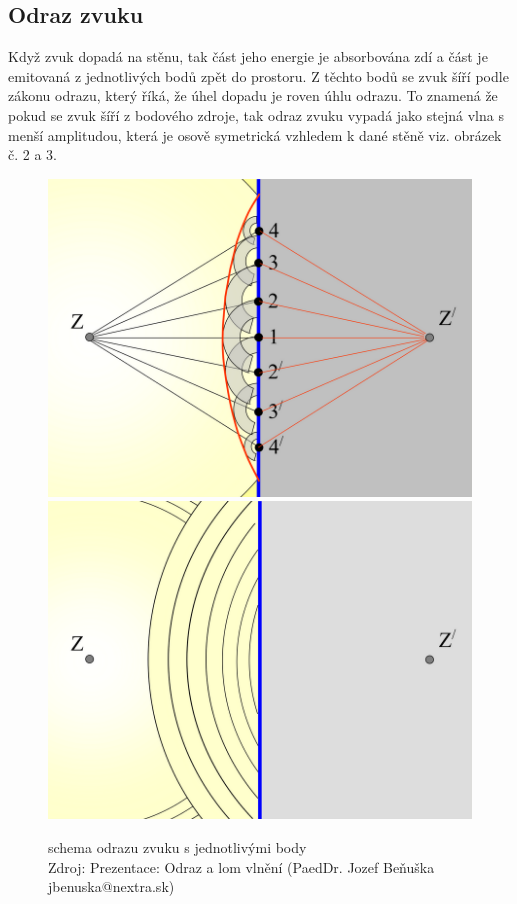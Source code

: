 \subsection{Odraz zvuku}
Když zvuk dopadá na stěnu, tak část jeho energie je absorbována zdí a část je emitovaná z jednotlivých bodů zpět do prostoru. Z těchto bodů se zvuk šíří podle zákonu odrazu, který říká, že úhel dopadu je roven úhlu odrazu. To znamená že pokud se zvuk šíří z bodového zdroje, tak odraz zvuku vypadá jako stejná vlna s menší amplitudou, která je osově symetrická vzhledem k dané stěně viz. obrázek č. 2 a 3. \cite{papirNaZvuk}
\begin{figure}
    \centering
    \includegraphics[width=0.5\linewidth]{Obrazky/odraz zvuku s bodama.png}
    \includegraphics[width=0.5\linewidth]{Obrazky/odraz zvuku bez bodu.png}
    \caption{schema odrazu zvuku s jednotlivými body\\
    Zdroj: Prezentace: Odraz a lom vlnění (PaedDr. Jozef Beňuška  jbenuska@nextra.sk)}
    \label{fig:enter-label}
\end{figure}